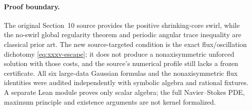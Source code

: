 \paragraph{Proof boundary.}
The original Section~10 source provides the
positive shrinking-core swirl, while the
no-swirl global regularity theorem and periodic
angular trace inequality are classical prior art.
The new source-targeted condition is the exact
flux/oscillation dichotomy \eqref{eq:xxxv-escape};
it does not produce a nonaxisymmetric unforced
solution with those costs, and the source's
numerical profile still lacks a frozen certificate.
All six large-data Gaussian formulas and the
nonaxisymmetric flux identities were audited
independently with symbolic algebra and rational
fixtures. A separate Lean module proves only
scalar algebra; the full Navier--Stokes PDE,
maximum principle and existence arguments are
not kernel formalized.
